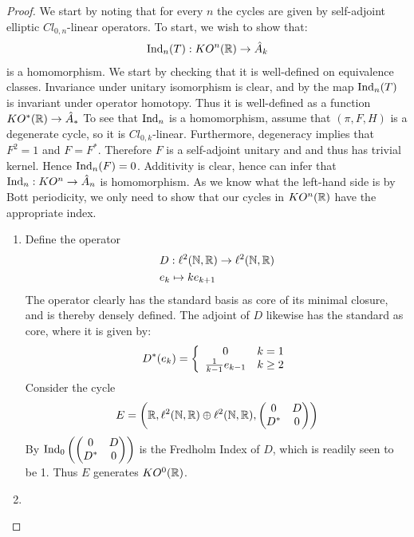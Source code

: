 \begin{proof}
We start by noting that for every $n$ the cycles are given by self-adjoint elliptic $Cl_{0,n}$-linear operators. 
To start, we wish to show that: 
\begin{align*}
	\operatorname{Ind}_n(T):KO^n(\mathbb{R})\to \hat{A}_k
\end{align*}
is a homomorphism. 
We start by checking that it is well-defined on equivalence classes. Invariance under unitary isomorphism is clear, and by  the map $\operatorname{Ind}_n(T)$ is invariant under operator homotopy. Thus it is well-defined as a function $KO^*(\mathbb{R})\to \hat{A}_*$
To see that $\operatorname{Ind}_n$ is a homomorphism, assume that $(\pi,F,H)$ is a degenerate cycle, so it is $Cl_{0,k}$-linear. Furthermore, degeneracy implies that $F^2=1$ and $F=F^*$. Therefore $F$ is a self-adjoint unitary and and thus has trivial kernel. Hence $\operatorname{Ind}_n(F)=0$. 
Additivity is clear, hence can infer that $\operatorname{Ind}_n: KO^n\to \hat{A}_n$ is homomorphism. As we know what the left-hand side is by Bott periodicity, we only need to show that our cycles in $KO^n(\mathbb{R})$ have the appropriate index. %
\begin{enumerate}
\item
	Define the operator 
	\begin{align*}
		&D:\ell^2(\mathbb{N},\mathbb{R})\to \ell^2(\mathbb{N},\mathbb{R}) \\
		&e_k\mapsto ke_{k+1}
	\end{align*}
	The operator clearly has the standard basis as core of its minimal closure, and is thereby densely defined. 
	The adjoint of $D$ likewise has the standard as core, where it is given by:
	\begin{align*}
		D^*(e_k)=\left \{\begin{array}{c c} 0 & k=1 \\ \frac{1}{k-1}e_{k-1} &  k\geq 2 \end{array} \right .
	\end{align*}
	Consider the cycle 
	\begin{align*}
		E=\left ( \mathbb{R}, \ell^2(\mathbb{N},\mathbb{R})\oplus \ell^2(\mathbb{N},\mathbb{R}), \begin{pmatrix} 0 & D \\ D^* & 0\end{pmatrix} \right )
	\end{align*}
	By  $\operatorname{Ind}_0\left ( \begin{pmatrix} 0 & D \\ D^* & 0\end{pmatrix}  \right )$ is the Fredholm Index of $D$, which is readily seen to be 1. Thus $E$ generates $KO^{0}(\mathbb{R})$. 
\item
	

\end{enumerate}
\end{proof}

